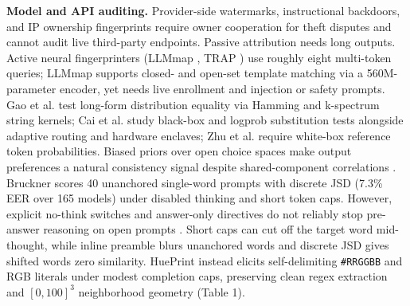 \textbf{Model and API auditing.} Provider-side watermarks, instructional backdoors, and IP ownership fingerprints \cite{ref11,ref12,ref13} require owner cooperation for theft disputes and cannot audit live third-party endpoints. Passive attribution \cite{ref14,ref15} needs long outputs. Active neural fingerprinters (LLMmap \cite{ref16}, TRAP \cite{ref17}) use roughly eight multi-token queries; LLMmap supports closed- and open-set template matching via a 560M-parameter encoder, yet needs live enrollment and injection or safety prompts. Gao et al. \cite{ref4} test long-form distribution equality via Hamming and k-spectrum string kernels; Cai et al. \cite{ref5} study black-box and logprob substitution tests alongside adaptive routing and hardware enclaves; Zhu et al. \cite{ref6} require white-box reference token probabilities. Biased priors over open choice spaces \cite{ref18,ref19,ref20,ref21} make output preferences a natural consistency signal despite shared-component correlations \cite{ref22,ref23}. Bruckner \cite{ref7} scores 40 unanchored single-word prompts with discrete JSD (7.3\% EER over 165 models) under disabled thinking and short token caps. However, explicit no-think switches and answer-only directives do not reliably stop pre-answer reasoning on open prompts \cite{ref24}. Short caps can cut off the target word mid-thought, while inline preamble blurs unanchored words and discrete JSD gives shifted words zero similarity. HuePrint instead elicits self-delimiting \texttt{\#RRGGBB} and RGB literals under modest completion caps, preserving clean regex extraction and $[0,100]^3$ neighborhood geometry (Table 1).


